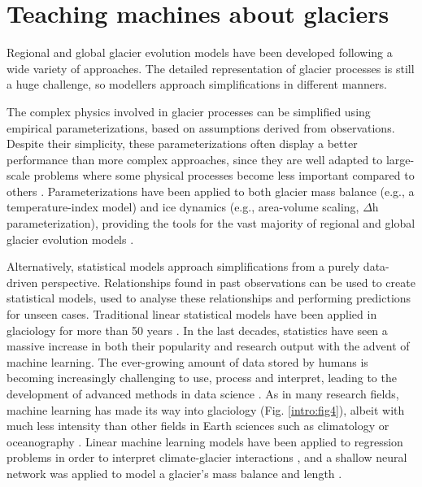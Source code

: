 \section{Teaching machines about glaciers}
\label{intro:ml}

Regional and global glacier evolution models have been developed following a wide variety of approaches. The detailed representation of glacier processes is still a huge challenge, so modellers approach simplifications in different manners. 

The complex physics involved in glacier processes can be simplified using empirical parameterizations, based on assumptions derived from observations. Despite their simplicity, these parameterizations often display a better performance than more complex approaches, since they are well adapted to large-scale problems where some physical processes become less important compared to others \citep{reveillet_relative_2018}. Parameterizations have been applied to both glacier mass balance (e.g., a temperature-index model) and ice dynamics (e.g., area-volume scaling, $\Delta$h parameterization), providing the tools for the vast majority of regional and global glacier evolution models \citep[e.g.,][]{marzeion_past_2012, huss_new_2015, maussion_open_2019, hock_glaciermip_2019}.

Alternatively, statistical models approach simplifications from a purely data-driven perspective. Relationships found in past observations can be used to create statistical models, used to analyse these relationships and performing predictions for unseen cases. Traditional linear statistical models have been applied in glaciology for more than 50 years \citep{hoinkes_glacier_1968, martin_correlation_1974}. In the last decades, statistics have seen a massive increase in both their popularity and research output with the advent of machine learning. The ever-growing amount of data stored by humans is becoming increasingly challenging to use, process and interpret, leading to the development of advanced methods in data science \citep{mjolsness_machine_2001}. As in many research fields, machine learning has  made its way into glaciology (Fig. \ref{intro:fig4}), albeit with much less intensity than other fields in Earth sciences such as climatology \citep[e.g.,][]{liu_application_2016,ham_deep_2019,jiang_deep_2018} or oceanography \citep[e.g.,][]{ducournau_deep_2016,lguensat_learning_2019}. Linear machine learning models have been applied to regression problems in order to interpret climate-glacier interactions \citep{maussion_enso_2015}, and a shallow neural network was applied to model a glacier's mass balance and length \citep{steiner_application_2005,steiner_sensitivity_2008}. 

